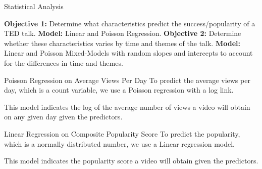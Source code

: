 \begin{frame}{Statistical Analysis}
\begin{outline}
    \1 \textbf{Objective 1:} Determine what characteristics predict the success/popularity of a TED talk. 
        \2 \textbf{Model:} Linear and Poisson Regression. 
    \1 \textbf{Objective 2:} Determine whether these characteristics varies by time and themes of the talk.
        \2 \textbf{Model:} Linear and Poisson Mixed-Models with random slopes and intercepts to account for the differences in time and themes.
\end{outline}
\end{frame}

\begin{frame}{Poisson Regression on Average Views Per Day}
To predict the average views per day, which is a count variable, we use a Poisson regression with a log link. 

This model indicates the log of the average number of views a video will obtain on any given day given the predictors.
    
\end{frame}

\begin{frame}{Linear Regression on Composite Popularity Score}
To predict the popularity, which is a normally distributed number, we use a Linear regression model.

This model indicates the popularity score a video will obtain given the predictors.
\end{frame}

